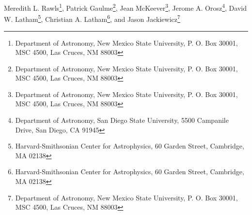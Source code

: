 Meredith L. Rawls\footnote{Department of Astronomy, New Mexico State University, P. O. Box 30001, MSC 4500, Las Cruces, NM 88003}, Patrick Gaulme\footnote{Department of Astronomy, New Mexico State University, P. O. Box 30001, MSC 4500, Las Cruces, NM 88003}, Jean McKeever\footnote{Department of Astronomy, New Mexico State University, P. O. Box 30001, MSC 4500, Las Cruces, NM 88003}, Jerome A. Orosz\footnote{Department of Astronomy, San Diego State University, 5500 Campanile Drive, San Diego, CA 91945}, David W. Latham\footnote{Harvard-Smithsonian Center for Astrophysics, 60 Garden Street, Cambridge, MA 02138}, Christian A. Latham\footnote{Harvard-Smithsonian Center for Astrophysics, 60 Garden Street, Cambridge, MA 02138}, and Jason Jackiewicz\footnote{Department of Astronomy, New Mexico State University, P. O. Box 30001, MSC 4500, Las Cruces, NM 88003}
  
  
  
  
  
  